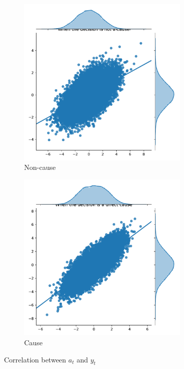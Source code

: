 \begin{frame}
    \begin{figure}[H]
      \centering
      \begin{subfigure}{0.45\textwidth}
        \includegraphics[width=0.9\textwidth]{../src/causality/a-y-non-cause}
        \caption{Non-cause}
      \end{subfigure}
      \hspace{1em}
      \begin{subfigure}{0.45\textwidth}
        \includegraphics[width=0.9\textwidth]{../src/causality/a-y-direct-cause}
        \caption{Cause}
      \end{subfigure}
      \caption{Correlation between $a_t$ and $y_t$}
      \label{fig:a-y-correlation}
    \end{figure}

  
\end{frame}
